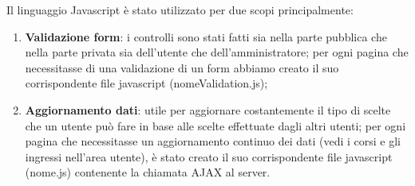Il linguaggio Javascript è stato utilizzato per due scopi principalmente:
\begin{enumerate}
    \item \textbf{Validazione form}: i controlli sono stati fatti sia nella parte pubblica che nella parte privata sia dell'utente che
    dell'amministratore; per ogni pagina che necessitasse di una validazione di un form abbiamo creato il suo corrispondente
    file javascript (nomeValidation.js);
    \item \textbf{Aggiornamento dati}: utile per aggiornare costantemente il tipo di scelte che un utente può fare in base alle scelte
    effettuate dagli altri utenti; per ogni pagina che necessitasse un aggiornamento continuo dei dati (vedi i corsi e gli
    ingressi nell'area utente), è stato creato il suo corrispondente file javascript (nome.js) contenente la chiamata AJAX al server.
\end{enumerate}